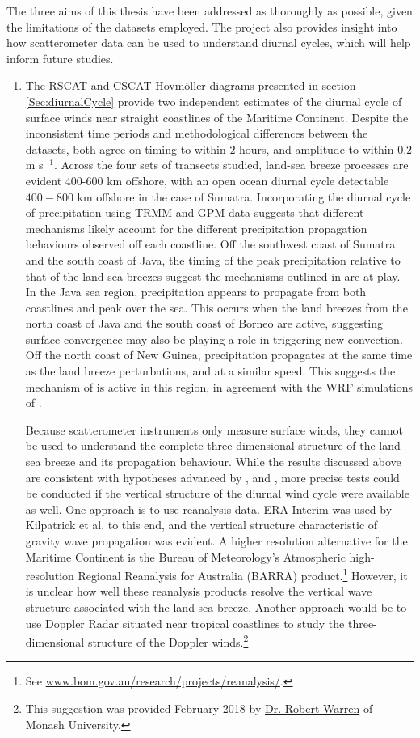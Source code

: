 \documentclass[12pt]{book}
\begin{document}
The three aims of this thesis have been addressed as thoroughly as possible, given the limitations of the datasets employed. The project also provides insight into how scatterometer data can be used to understand diurnal cycles, which will help inform future studies.  
\begin{enumerate}
\item
The RSCAT and CSCAT Hovm\"{o}ller diagrams presented in section \ref{Sec:diurnalCycle} provide two independent estimates of the diurnal cycle of surface winds near straight coastlines of the Maritime Continent. Despite the inconsistent time periods and methodological differences between the datasets, both agree on timing to within $2$ hours, and amplitude to within $0.2$ m s$^{-1}$. Across the four sets of transects studied, land-sea breeze processes are evident $400$-$600$ km offshore, with an open ocean diurnal cycle detectable $400-800$ km offshore in the case of Sumatra. Incorporating the diurnal cycle of precipitation using TRMM and GPM data suggests that different mechanisms likely account for the different precipitation propagation behaviours observed off each coastline. Off the southwest coast of Sumatra and the south coast of Java, the timing of the peak precipitation relative to that of the land-sea breezes suggest the mechanisms outlined in \citet{kilpatrick17} are at play. In the Java sea region, precipitation appears to propagate from both coastlines and peak over the sea. This occurs when the land breezes from the north coast of Java and the south coast of Borneo are active, suggesting surface convergence may also be playing a role in triggering new convection. Off the north coast of New Guinea, precipitation propagates at the same time as the land breeze perturbations, and at a similar speed. This suggests the mechanism of \citet{mapes03b} is active in this region, in agreement with the WRF simulations of \citet{vincent16}.  

Because scatterometer instruments only measure surface winds, they cannot be used to understand the complete three dimensional structure of the land-sea breeze and its propagation behaviour. While the results discussed above are consistent with hypotheses advanced by \citet{mapes03b}, \citet{kilpatrick17} and \citet{vincent16}, more precise tests could be conducted if the vertical structure of the diurnal wind cycle were available as well. One approach is to use reanalysis data. ERA-Interim was used by Kilpatrick et al. to this end, and the vertical structure characteristic of gravity wave propagation was evident. A higher resolution alternative for the Maritime Continent is the Bureau of Meteorology's Atmospheric high-resolution Regional Reanalysis for Australia (BARRA) 
product.\footnote{See \href{http://www.bom.gov.au/research/projects/reanalysis/}{www.bom.gov.au/research/projects/reanalysis/}.} However, it is unclear how well these reanalysis products resolve the vertical wave structure associated with the land-sea breeze. Another approach would be to use Doppler Radar situated near tropical coastlines to study the three-dimensional structure of the Doppler winds.\footnote{This suggestion was provided February 2018 by  \href{https://www.climatescience.org.au/staff/profile/RWarren}{Dr. Robert Warren} of Monash University.}


\end{enumerate}
\end{document}
